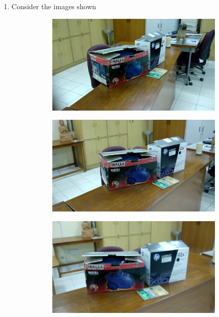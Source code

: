 \documentclass{article}
\begin{document}
\begin{enumerate}
\begin{tabular}{|c | c | c | c |}
					\end{tabular}
				\item Consider the images shown
				\begin{figure}[H]
					\centering
					\begin{subfigure}{.33\textwidth}
					  	\centering
					  	\includegraphics[width=1.0\linewidth]{1_0_image.jpg}
					  	\caption{}
					  	\label{fig:sub1}
					\end{subfigure}%
					\begin{subfigure}{.33\textwidth}
					  	\centering
					  	\includegraphics[width=1.0\linewidth]{1_1_image.jpg}
					  	\caption{}
					  	\label{fig:sub2}
					\end{subfigure}
					\begin{subfigure}{.33\textwidth}
					  	\centering
					  	\includegraphics[width=1.0\linewidth]{1_2_image.jpg}

\end{subfigure}
\end{figure}
\end{enumerate}
\end{document}
